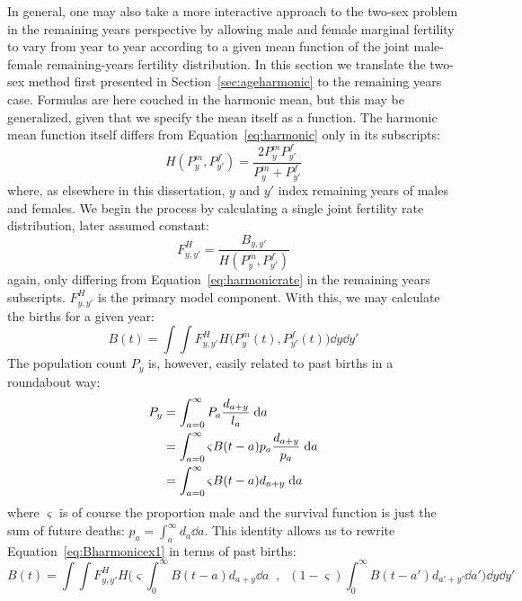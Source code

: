  \FloatBarrier
In general, one may also take a more interactive approach to the two-sex
problem in the remaining years perspective by allowing male and female marginal
fertility to vary from year to year according to a given mean function of the
joint male-female remaining-years fertility distribution. In this section we
translate the two-sex method first presented in Section~\ref{sec:ageharmonic}
to the remaining years case. Formulas are here couched in the harmonic
mean, but this may be generalized, given that we specify the mean itself as
a function. The harmonic mean function itself differs from
Equation~\eqref{eq:harmonic} only in its subscripts:
\begin{equation}
H(P_y^m, P_{y'}^f) = \frac{2 P_y^m P_{y'}^f}{P_y^m + P_{y'}^f}
\end{equation}
where, as elsewhere in this dissertation, $y$ and $y'$ index remaining years of
males and females. We begin the process by calculating a single joint fertility rate distribution,
later assumed constant:
 \begin{equation}
 F_{y,y'}^H = \frac{B_{y,y'}}{H(P_y^m, P_{y'}^f)}
 \end{equation}
again, only differing from Equation~\eqref{eq:harmonicrate} in the remaining
years subscripts. $F_{y,y'}^H$ is the primary model component. With this, we may
calculate the births for a given year:
 \begin{equation}
 \label{eq:Bharmonicex1}
 B(t) = \int \int F_{y,y'}^H H\Big(P_{y}^m(t), P_{y'}^f(t)\Big) \dd y \dd
 y'
 \end{equation}
The population count $P_y$ is, however, easily related to past births in a
roundabout way:
\begin{align}
P_y &= \int_{a=0}^\infty P_a \frac{d_{a+y}}{l_a} \; \mathrm{d} a \notag \\
    &= \int_{a=0}^\infty \varsigma B(t-a)p_a \frac{d_{a+y}}{p_a} \; \mathrm{d} a \notag \\
    &= \int_{a=0}^\infty \varsigma B(t-a)d_{a+y} \; \mathrm{d} a
\end{align}
where $\varsigma$ is of course the proportion male and the survival function is
just the sum of future deaths: $p_a = \int _a^\infty d_a \dd a$. This identity
allows us to rewrite Equation~\eqref{eq:Bharmonicex1} in terms of past births:
 \begin{equation}
 \label{eq:Bharmonicex1}
 B(t) = \int \int F_{y,y'}^H H\Bigg(\varsigma \int _0^\infty B(t-a)d_{a+y}\dd
 a\;\;,\;\; (1-\varsigma) \int _0^\infty B(t-a')d_{a'+y'} \dd a'\Bigg) \dd y \dd
 y'
 \end{equation}
